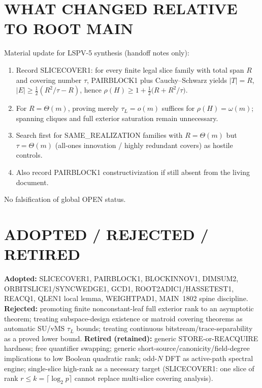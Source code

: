 \documentclass[11pt]{article}
\begin{document}
\section*{WHAT CHANGED RELATIVE TO ROOT MAIN}
Material update for LSPV-5 synthesis (handoff notes only):
\begin{enumerate}
\item Record SLICECOVER1: for every finite legal slice family with total span $R$ and covering number
$\tau$, PAIRBLOCK1 plus Cauchy--Schwarz yields
$|T|=R$, $|E|\ge\tfrac12(R^2/\tau-R)$, hence
$\rho(H)\ge 1+\tfrac12\bigl(R+R^2/\tau\bigr)$.
\item For $R=\Theta(m)$, proving merely $\tau_L=o(m)$ suffices for $\rho(H)=\omega(m)$;
spanning cliques and full exterior saturation remain unnecessary.
\item Search first for SAME\_REALIZATION families with $R=\Theta(m)$ but $\tau=\Theta(m)$
(all-ones innovation / highly redundant covers) as hostile controls.
\item Also record PAIRBLOCK1 constructivization if still absent from the living document.
\end{enumerate}
No falsification of global OPEN status.

\section*{ADOPTED / REJECTED / RETIRED}
\textbf{Adopted:} SLICECOVER1, PAIRBLOCK1, BLOCKINNOV1, DIMSUM2, ORBITSLICE1/SYNCWEDGE1, GCD1,
ROOT2ADIC1/HASSETEST1, REACQ1, QLEN1 local lemma, WEIGHTPAD1, MAIN~1802 spine discipline.
\textbf{Rejected:} promoting finite nonconstant-leaf full exterior rank to an asymptotic theorem;
treating subspace-design existence or matroid covering theorems as automatic SU/vMS $\tau_L$ bounds;
treating continuous bitstream/trace-separability as a proved lower bound.
\textbf{Retired (retained):} generic STORE-or-REACQUIRE hardness; free quantifier swapping;
generic short-source/canonicity/field-degree implications to low Boolean quadratic rank;
odd-$N$ DFT as active-path spectral engine; single-slice high-rank as a necessary target
(SLICECOVER1: one slice of rank $r\le k=\lceil\log_2 p\rceil$ cannot replace multi-slice covering analysis).
\end{document}
